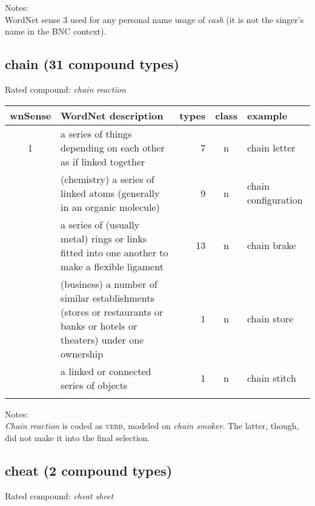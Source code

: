 \noindent
Notes:\\ WordNet sense 3 used for any personal name usage of \emph{cash}
(it is not the singer's name in the BNC context). 

\pagebreak[4]
\subsection{chain  (31 compound types)}      
Rated compound: \emph{chain reaction}

\vspace*{1ex}

\noindent
\begin{longtable}{c>{\raggedright\arraybackslash}p{5cm}rc>{\raggedright\arraybackslash}p{2cm}}\lsptoprule
{\small wnSense}&WordNet description&types&class&example\\\midrule
1&a series of things depending on each other as if linked together&7&n&chain letter\\\tablevspace
2&(chemistry) a series of linked atoms (generally in an organic molecule)&9&n&chain configuration\\\tablevspace
3&a series of (usually metal) rings or links fitted into one another to make a flexible ligament&13&n&chain brake\\\tablevspace
4&(business) a number of similar establishments (stores or restaurants or banks or hotels or theaters) under one ownership&1&n&chain store\\\tablevspace
9&a linked or connected series of objects&1&n&chain stitch\\\lspbottomrule
\end{longtable}
\noindent
Notes:\\ \emph{Chain reaction} is coded as \textsc{verb}, modeled on \emph{chain
  smoker}. The latter, though, did not make it into the final selection.


\subsection{cheat  (2 compound types)}      
Rated compound: \emph{cheat sheet}

\vspace*{1ex}

